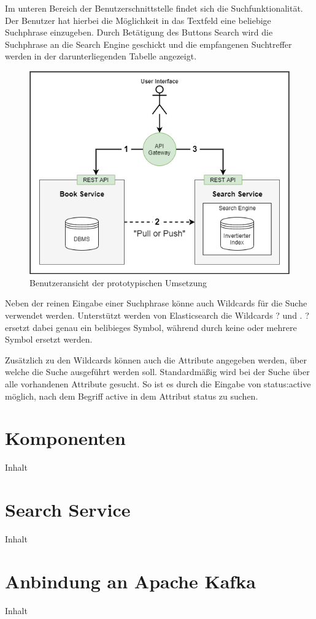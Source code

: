 Im unteren Bereich der Benutzerschnittstelle findet sich die Suchfunktionalität. Der Benutzer hat hierbei die Möglichkeit in das Textfeld eine beliebige Suchphrase einzugeben. Durch Betätigung des Buttons \glqq Search\grqq{} wird die Suchphrase an die Search Engine geschickt und die empfangenen Suchtreffer werden in der darunterliegenden Tabelle angezeigt.

\begin{figure}[H]
    \centering
    \includegraphics[width=0.9\linewidth]{images/pullpush_aktualisierung.png}
    \caption{Benutzeransicht der prototypischen Umsetzung}
    \label{fig:UserInterface}
\end{figure}

Neben der reinen Eingabe einer Suchphrase könne auch Wildcards für die Suche verwendet werden. Unterstützt werden von Elasticsearch die Wildcards \glqq ?\grqq{} und \glqq *\grqq{}. \glqq ?\grqq{} ersetzt dabei genau ein belibieges Symbol, während durch \glqq *\grqq{} keine oder mehrere Symbol ersetzt werden.

Zusätzlich zu den Wildcards können auch die Attribute angegeben werden, über welche die Suche ausgeführt werden soll. Standardmäßig wird bei der Suche über alle vorhandenen Attribute gesucht. So ist es durch die Eingabe von \glqq status:active\grqq{} möglich, nach dem Begriff \glqq active\grqq{} in dem Attribut \glqq status\grqq{} zu suchen.

\section{Komponenten\label{sec5.2:Unterpunkt-2}}

Inhalt

\section{Search Service\label{sec5.3:Unterpunkt-3}}

Inhalt

\section{Anbindung an Apache Kafka\label{sec5.4:Unterpunkt-4}}

Inhalt